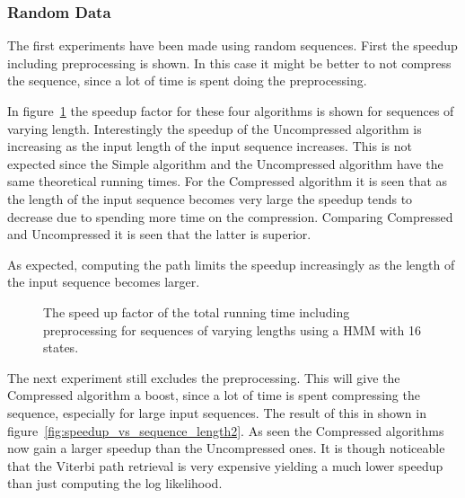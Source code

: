 %   

\subsubsection{Random Data}
\label{sec:random-data}

The first experiments have been made using random sequences. First the speedup
including preprocessing is shown. In this case it might be better to not
compress the sequence, since a lot of time is spent doing the
preprocessing.

In figure~\ref{fig:speedup_vs_sequence_length} the speedup factor for these
four algorithms is shown for sequences of varying length. Interestingly the
speedup of the Uncompressed algorithm is increasing as the input length of the
input sequence increases. This is not expected since the Simple algorithm and
the Uncompressed algorithm have the same theoretical running times. For the
Compressed algorithm it is seen that as the length of the input sequence
becomes very large the speedup tends to decrease due to spending more time on
the compression.  Comparing Compressed and Uncompressed it is seen that the latter
is superior.

As expected, computing the path limits the speedup increasingly as the length
of the input sequence becomes larger. 

\begin{figure}
  \centering
  
  \caption{The speed up factor of the total running time including preprocessing
    for sequences of varying lengths using a HMM with 16 states.}
  \label{fig:speedup_vs_sequence_length}
\end{figure}

The next experiment still excludes the preprocessing. This will give the
Compressed algorithm a boost, since a lot of time is spent compressing the
sequence, especially for large input sequences. The result of this in shown in
figure~\ref{fig:speedup_vs_sequence_length2}. As seen the Compressed algorithms
now gain a larger speedup than the Uncompressed ones. It is though noticeable
that the Viterbi path retrieval is very expensive yielding a much lower speedup
than just computing the log likelihood.

